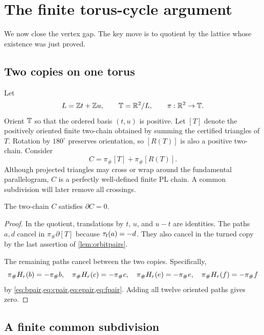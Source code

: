 \section{The finite torus-cycle argument}
\label{sec:torus}

We now close the vertex gap.  The key move is to quotient by the lattice whose existence was just proved.

\subsection{Two copies on one torus}

Let
\[
 L=\mathbb Z t+\mathbb Z u,
 \qquad
 \mathbb T=\mathbb R^2/L,
 \qquad
 \pi:\mathbb R^2\to\mathbb T.
\]
Orient \(\mathbb T\) so that the ordered basis \((t,u)\) is positive.  Let \([T]\) denote the positively oriented finite two-chain obtained by summing the certified triangles of \(T\).  Rotation by \(180^\circ\) preserves orientation, so \([R(T)]\) is also a positive two-chain.  Consider
\begin{equation}
 C=\pi_\#[T]+\pi_\#[R(T)].
 \label{eq:toruschain}
\end{equation}
Although projected triangles may cross or wrap around the fundamental parallelogram, \(C\) is a perfectly well-defined finite PL chain.  A common subdivision will later remove all crossings.

\begin{lemma}
\label{lem:boundaryzero}
The two-chain \(C\) satisfies \(\partial C=0\).
\end{lemma}
\begin{proof}
In the quotient, translations by \(t\), \(u\), and \(u-t\) are identities.  The paths \(a,d\) cancel in \(\pi_\#\partial[T]\) because \(\tau_{t}(a)=-d\).  They also cancel in the turned copy by the last assertion of \cref{lem:orbitpairs}.

The remaining paths cancel between the two copies.  Specifically,
\[
 \pi_\#H_{r}(b)=-\pi_\#b,
 \quad
 \pi_\#H_{r}(c)=-\pi_\#c,
 \quad
 \pi_\#H_{r}(e)=-\pi_\#e,
 \quad
 \pi_\#H_{r}(f)=-\pi_\#f
\]
by \cref{eq:bpair,eq:cpair,eq:epair,eq:fpair}.  Adding all twelve oriented paths gives zero.
\end{proof}

\subsection{A finite common subdivision}

